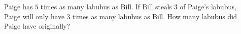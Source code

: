 Paige has $5$ times as many labubus as Bill. If Bill steals $3$ of Paige's labubus, Paige will only have $3$ times as many labubus as Bill. How many labubus did Paige have originally?
